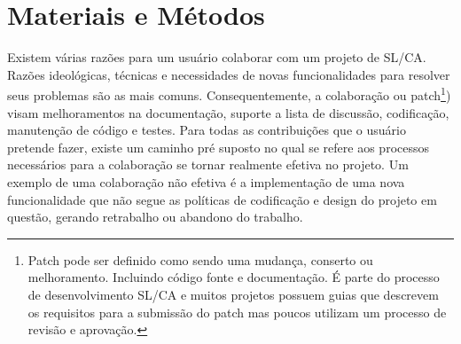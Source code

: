 % 
% 
% 
% 

\section{Materiais e Métodos} \label{sec:materiais}


Existem várias razões para um usuário colaborar com um projeto de SL/CA. Razões ideológicas, técnicas e necessidades de novas funcionalidades para resolver seus problemas são as mais comuns. Consequentemente, a colaboração ou patch\footnote{Patch pode ser definido como sendo uma mudança, conserto ou melhoramento. Incluindo código fonte e documentação. É parte do processo de desenvolvimento SL/CA e muitos projetos possuem guias que descrevem os requisitos para a submissão do patch mas poucos utilizam um processo de revisão e aprovação.\cite{preliminary}}) visam melhoramentos na documentação, suporte a lista de discussão, codificação, manutenção de código e testes. Para todas as contribuições que o usuário pretende fazer, existe um caminho pré suposto no qual se refere aos processos necessários para a colaboração se tornar realmente efetiva no projeto. Um exemplo de uma colaboração não efetiva é a implementação de uma nova funcionalidade que não segue as políticas de codificação e design do projeto em questão, gerando retrabalho ou abandono do trabalho.

